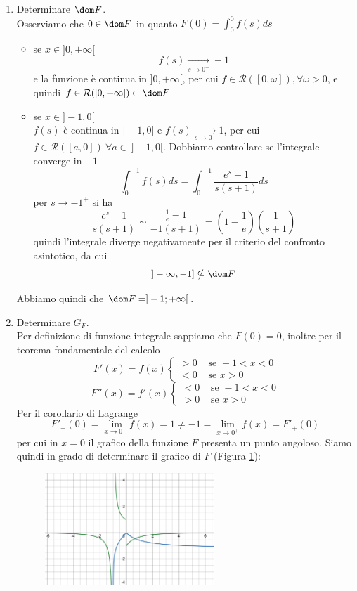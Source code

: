 \documentclass{article}
\newcommand{\se}{\text{ se }}
\begin{document}
\begin{enumerate}[label=\textbf{Esercizio 12.\arabic*.},itemindent=*]
\begin{enumerate}
    \item Determinare $\dom F$.\\    
    Osserviamo che $0\in \dom F$ in quanto $F(0)=\int_0^0f(s)ds$
    \begin{itemize}
        \item se $x \in ]0,+\infty[$
        \[f(s)\underset{s\to0^+}{\longrightarrow}- 1\]
        e la funzione è continua in $]0,+\infty[$, per cui $f\in \mathcal{R}([0,\omega]), \forall \omega >0$, e quindi $f\in \mathcal{R}(]0,+\infty[)\subset \dom F$
        \item se $x\in]-1,0[$\\
        $f(s)$ è continua in $]-1,0[$ e $f(s)\underset{s\to0^-}{\longrightarrow}1$, per cui $f\in \mathcal{R}([a,0])~\forall a\in ~]-1,0[$.
        Dobbiamo controllare se l'integrale converge in $-1$
        \[\int_0^{-1}f(s)ds=\int_0^{-1}\frac{e^s-1}{s(s+1)}ds\]
        per $s\to-1^+$ si ha 
        \[\frac{e^s-1}{s(s+1)}\sim \frac{\frac{1}{e}-1}{-1(s+1)}=\left( 1-\frac{1}{e} \right)\left( \frac{1}{s+1} \right)\]
        quindi l'integrale diverge negativamente per il criterio del confronto asintotico, da cui
        \[]-\infty,-1]\nsubseteq\dom F\]
    \end{itemize}
    Abbiamo quindi che $\dom F=]-1;+\infty[$.
    \item Determinare $G_F$.\\
    Per definizione di funzione integrale sappiamo che $F(0)=0$, inoltre per il teorema fondamentale del calcolo
    \[F'(x)=f(x)\begin{cases}
        >0&\se -1<x<0\\
        <0&\se x>0
    \end{cases}\]
    \[F''(x)=f'(x)\begin{cases}
        <0&\se -1<x<0\\
        >0&\se x>0
    \end{cases}\]
    Per il corollario di Lagrange
    \[F'_-(0)=\lim_{x\to0^-}f(x)=1\neq -1=\lim_{x\to0^+}f(x)=F'_+(0)\]
    per cui in $x=0$ il grafico della funzione $F$ presenta un punto angoloso.
    Siamo quindi in grado di determinare il grafico di $F$ (Figura \ref{fig:1.2}):
    \begin{figure}[ht]
        \centering
        \includegraphics[width=0.6\textwidth]{src/disegno2.png}
        \caption{}
        \label{fig:1.2}
    \end{figure}
\end{enumerate}


\end{enumerate}
\end{document}
